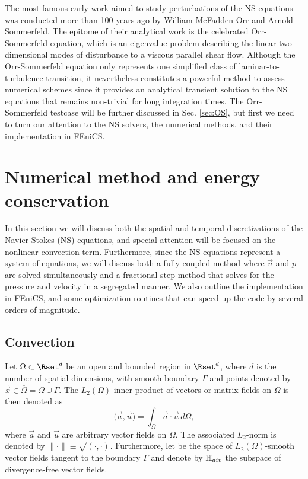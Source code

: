 The most famous early work aimed to study perturbations of the NS equations was conducted more than 100 years ago by William McFadden Orr and Arnold Sommerfeld. The epitome of their analytical work is the celebrated Orr-Sommerfeld equation, which is an eigenvalue problem describing the linear two-dimensional modes of disturbance to a viscous parallel shear flow. Although the Orr-Sommerfeld equation only represents one simplified class of laminar-to-turbulence transition, it nevertheless constitutes a powerful method to assess numerical schemes since it provides an analytical transient solution to the NS equations that remains non-trivial for long integration times. The Orr-Sommerfeld testcase will be further discussed in Sec. \ref{sec:OS}, but first we need to turn our attention to the NS solvers, the numerical methods, and their implementation in FEniCS.

\section{Numerical method and energy conservation}
\label{sec:Numerical}
In this section we will discuss both the spatial and temporal discretizations of the Navier-Stokes (NS) equations, and special attention will be focused on the nonlinear convection term. Furthermore, since the NS equations represent a system of equations, we will discuss both a fully coupled method where $\vec{u}$ and $p$ are solved simultaneously and a fractional step method that solves for the pressure and velocity in a segregated manner. We also outline the implementation in FEniCS, and some optimization routines that can speed up the code by several orders of magnitude.

\subsection{Convection}
\label{sec:Convection}
Let $\Omega \subset \Rset^d$ be an open and bounded region in $\Rset^d$, where $d$ is the number of spatial dimensions, with smooth boundary $\Gamma$ and points denoted by $\vec{x}\in \overline{\Omega}=\Omega \cup \Gamma$. The $L_2(\Omega)$ inner product of vectors or matrix fields on $\Omega$ is then denoted as
\begin{equation}
 \bigl( \vec{a},\vec{u} \bigr) = \int_{\Omega} \vec{a}\cdot \vec{u}\, d\Omega,
 \label{eq:L2}
\end{equation}
where $\vec{a}$ and $\vec{u}$ are arbitrary vector fields on $\Omega$. The associated $L_2$-norm is denoted by $\| \cdot \| \equiv \sqrt{\left( \cdot, \cdot \right)}$. Furthermore, let \Hset be the space of $L_2(\Omega)$-smooth vector fields tangent to the boundary $\Gamma$ and denote by $\mathbb{H}_{div}$ the subspace of divergence-free vector fields.

